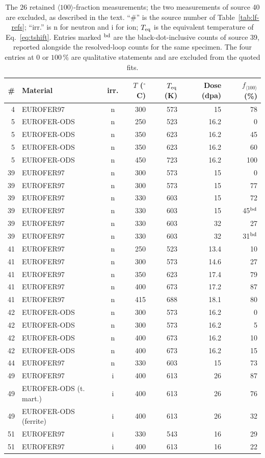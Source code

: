 \begin{table}[htbp]
\centering\small
\caption{The $26$ retained $\langle 100\rangle$-fraction measurements; the two
measurements of source 40 are excluded, as described in the text. ``\#'' is the source
number of Table~\ref{tab:lf-refs}; ``irr.'' is n for neutron and i for ion;
$T_{\rm eq}$ is the equivalent temperature of Eq.~\eqref{eq:tshift}. Entries marked
$^{\rm bd}$ are the black-dot-inclusive counts of source 39, reported alongside the
resolved-loop counts for the same specimen. The four entries at $0$ or $100\,\%$ are
qualitative statements and are excluded from the quoted fits.}
\label{tab:lf-data}
\begin{tabular}{rlcrrrr}
\toprule
\# & Material & irr. & $T$ ($^{\circ}$C) & $T_{\rm eq}$ (K) & Dose (dpa) &
$f_{\langle 100\rangle}$ (\%) \\
\midrule
4 & EUROFER97 & n & 300 & 573 & 15 & 78 \\
5 & EUROFER-ODS & n & 250 & 523 & 16.2 & 0 \\
5 & EUROFER-ODS & n & 350 & 623 & 16.2 & 45 \\
5 & EUROFER-ODS & n & 350 & 623 & 16.2 & 60 \\
5 & EUROFER-ODS & n & 450 & 723 & 16.2 & 100 \\
39 & EUROFER97 & n & 300 & 573 & 15 & 0 \\
39 & EUROFER97 & n & 300 & 573 & 15 & 77 \\
39 & EUROFER97 & n & 330 & 603 & 15 & 72 \\
39 & EUROFER97 & n & 330 & 603 & 15 & 45$^{\rm bd}$ \\
39 & EUROFER97 & n & 330 & 603 & 32 & 27 \\
39 & EUROFER97 & n & 330 & 603 & 32 & 31$^{\rm bd}$ \\
41 & EUROFER97 & n & 250 & 523 & 13.4 & 10 \\
41 & EUROFER97 & n & 300 & 573 & 14.6 & 27 \\
41 & EUROFER97 & n & 350 & 623 & 17.4 & 79 \\
41 & EUROFER97 & n & 400 & 673 & 17.2 & 87 \\
41 & EUROFER97 & n & 415 & 688 & 18.1 & 80 \\
42 & EUROFER-ODS & n & 300 & 573 & 16.2 & 0 \\
42 & EUROFER-ODS & n & 300 & 573 & 16.2 & 5 \\
42 & EUROFER-ODS & n & 400 & 673 & 16.2 & 10 \\
42 & EUROFER-ODS & n & 400 & 673 & 16.2 & 15 \\
44 & EUROFER97 & n & 330 & 603 & 15 & 73 \\
49 & EUROFER97 & i & 400 & 613 & 26 & 87 \\
49 & EUROFER-ODS (t.\,mart.) & i & 400 & 613 & 26 & 76 \\
49 & EUROFER-ODS (ferrite) & i & 400 & 613 & 26 & 32 \\
51 & EUROFER97 & i & 330 & 543 & 16 & 29 \\
51 & EUROFER97 & i & 400 & 613 & 16 & 22 \\
\bottomrule
\end{tabular}
\end{table}

